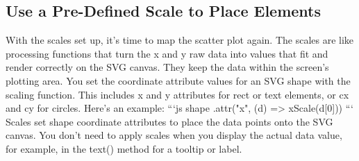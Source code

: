 \documentclass{article}%
\begin{document}
%
\subsection{Use a Pre{-}Defined Scale to Place Elements}%
\label{subsec:UseaPre{-}DefinedScaletoPlaceElements}%
With the scales set up, it's time to map the scatter plot again. The scales are like processing functions that turn the x and y raw data into values that fit and render correctly on the SVG canvas. They keep the data within the screen's plotting area.\newline%
You set the coordinate attribute values for an SVG shape with the scaling function. This includes x and y attributes for rect or text elements, or cx and cy for circles. Here's an example:\newline%
```js\newline%
shape\newline%
  .attr("x", (d) => xScale(d{[}0{]}))\newline%
```\newline%
Scales set shape coordinate attributes to place the data points onto the SVG canvas. You don't need to apply scales when you display the actual data value, for example, in the text() method for a tooltip or label.\newline%

%
\end{document}

